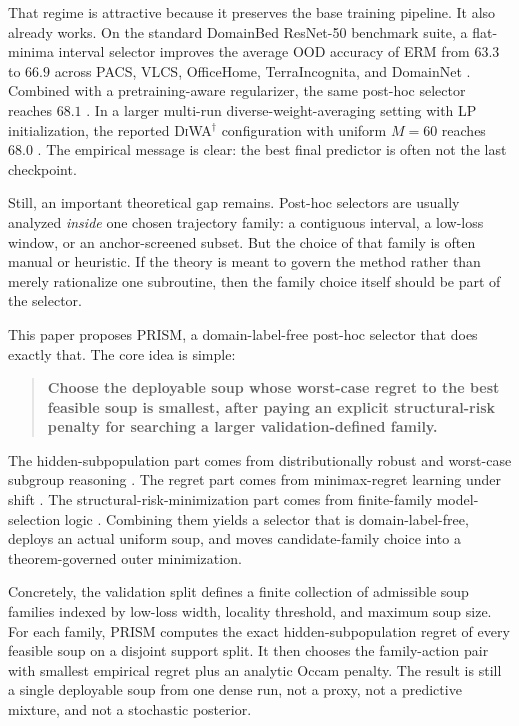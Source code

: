 \documentclass{article}
\newcommand{\prism}{\textup{\textsc{PRISM}}}
\newcommand{\diwa}{\textup{\textsc{DiWA}}}
\newcommand{\erm}{\textup{\textsc{ERM}}}
\newcommand{\ood}{OOD}
\newcommand{\1}{\mathbbm{1}}
\begin{document}
That regime is attractive because it preserves the base training pipeline. It also already works. On the standard DomainBed ResNet-50 benchmark suite, a flat-minima interval selector improves the average \ood{} accuracy of \erm{} from \(63.3\) to \(66.9\) across PACS, VLCS, OfficeHome, TerraIncognita, and DomainNet \citep{cha2021swad}. Combined with a pretraining-aware regularizer, the same post-hoc selector reaches \(68.1\) \citep{cha2022miro}. In a larger multi-run diverse-weight-averaging setting with LP initialization, the reported \diwa{}$^\dagger$ configuration with uniform \(M=60\) reaches \(68.0\) \citep{rame2022diwa}. The empirical message is clear: the best final predictor is often not the last checkpoint.

Still, an important theoretical gap remains. Post-hoc selectors are usually analyzed \emph{inside} one chosen trajectory family: a contiguous interval, a low-loss window, or an anchor-screened subset. But the choice of that family is often manual or heuristic. If the theory is meant to govern the method rather than merely rationalize one subroutine, then the family choice itself should be part of the selector.

This paper proposes \prism{}, a domain-label-free post-hoc selector that does exactly that. The core idea is simple:
\begin{quote}
\textbf{Choose the deployable soup whose worst-case regret to the best feasible soup is smallest, after paying an explicit structural-risk penalty for searching a larger validation-defined family.}
\end{quote}

The hidden-subpopulation part comes from distributionally robust and worst-case subgroup reasoning \citep{duchi2021learning,li2021worstcase,hashimoto2018fairness,lahoti2020fairness}. The regret part comes from minimax-regret learning under shift \citep{agarwal2022mro}. The structural-risk-minimization part comes from finite-family model-selection logic \citep{bartlett2002rademacher}. Combining them yields a selector that is domain-label-free, deploys an actual uniform soup, and moves candidate-family choice into a theorem-governed outer minimization.

Concretely, the validation split defines a finite collection of admissible soup families indexed by low-loss width, locality threshold, and maximum soup size. For each family, \prism{} computes the exact hidden-subpopulation regret of every feasible soup on a disjoint support split. It then chooses the family-action pair with smallest empirical regret plus an analytic Occam penalty. The result is still a single deployable soup from one dense run, not a proxy, not a predictive mixture, and not a stochastic posterior.
\end{document}
